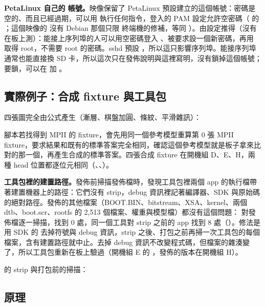 \textbf{PetaLinux 自己的  帳號。}映像保留了 PetaLinux 預設建立的這個帳號：密碼是空的、而且已經過期，可以用  執行任何指令，登入的 PAM 設定允許空密碼（ 的 ；這個映像的  沒有 Debian 那個只限  終端機的修補，等同 ）。由設定推得（沒有在板上測）：能接上序列埠的人可以用空密碼登入 、被要求設一個新密碼，再用  取得 root，不需要 root 的密碼。sshd 預設 ，所以這只影響序列埠。能接序列埠通常也能直接換 SD 卡，所以這次只在發佈說明與這裡寫明，沒有鎖掉這個帳號；要鎖，可以在  加 。

\subsection{實際例子：合成 fixture 與工具包}

四張圖完全由公式產生（漸層、棋盤加圓、條紋、平滑雜訊）：


腳本若找得到 MPII 的 fixture，會先用同一個參考模型重算第 0 張 MPII fixture，要求結果和既有的標準答案完全相同，確認這個參考模型就是板子拿來比對的那一個，再產生合成的標準答案。四張合成 fixture 在開機組 D、E、H，兩種 head 位置都逐位元相同（、、）。

\begin{pit}
\textbf{工具包裡的建置路徑。}發佈前掃描發佈檔時，發現工具包裡兩個 app 的執行檔帶著建置機器上的路徑：它們沒有 strip，debug 資訊裡記著編譯器、SDK 與原始碼的絕對路徑。發佈的其他檔案（BOOT.BIN、bitstream、XSA、kernel、兩個 dtb、boot.scr、rootfs 的 2,513 個檔案、權重與模型檔）都沒有這個問題： 對發佈檔逐一掃描，找到 0 處，同一個工具對 strip 之前的 app 找到 8 處（）。修法是  用 SDK 的  去掉符號與 debug 資訊，strip 之後、打包之前再掃一次工具包的每個檔案，含有建置路徑就中止。去掉 debug 資訊不改變程式碼，但檔案的雜湊變了，所以工具包重新在板上驗過（開機組 E 的 ，發佈的版本在開機組 H）。
\end{pit}

 的 strip 與打包前的掃描：


\subsection{原理}

